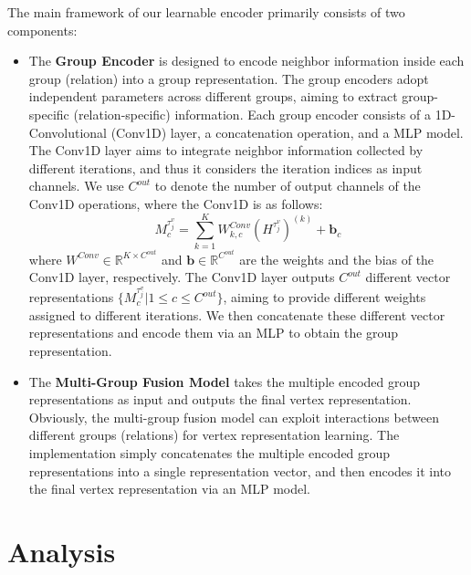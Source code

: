 \documentclass[lettersize,journal]{IEEEtran}
\begin{document}
The main framework of our learnable encoder primarily consists of two components:
\begin{itemize}
\item The \textbf{Group Encoder} is designed to encode neighbor information inside each group (relation) into a group representation.
The group encoders adopt independent parameters across different groups, aiming to extract group-specific (relation-specific) information. 
Each group encoder consists of a 1D-Convolutional (Conv1D) layer, a concatenation operation, and a MLP model.
The Conv1D layer aims to integrate neighbor information collected by different iterations, and thus it considers the iteration indices as input channels.
We use $C^{out}$ to denote the number of output channels of the Conv1D operations, where the Conv1D is as follows:
\begin{equation}
M_{c}^{\tau^{v}_{j}} = \sum \limits_{k=1}^{K} W^{Conv}_{k,c} (H^{\tau^{v}_{j}})^{(k)} + \mathbf{b}_{c}
\end{equation}
where $W^{Conv} \in \mathbb{R}^{K \times C^{out}}$ and $\mathbf{b} \in \mathbb{R}^{C^{out}}$ are the weights and the bias of the Conv1D layer, respectively. 
The Conv1D layer outputs $C^{out}$ different vector representations $\{M_{c}^{\tau^{v}_{j}} | 1 \le c \le C^{out}\}$, aiming to provide different weights assigned to different iterations.
We then concatenate these different vector representations and encode them via an MLP to obtain the group representation.
\item The \textbf{Multi-Group Fusion Model} takes the multiple encoded group representations as input and outputs the final vertex representation.
Obviously, the multi-group fusion model can exploit interactions between different groups (relations) for vertex representation learning.
The implementation simply concatenates the multiple encoded group representations into a single representation vector, and then encodes it into the final vertex representation via an MLP model. 
\end{itemize}

  









  


  



\section{Analysis}
\end{document}
